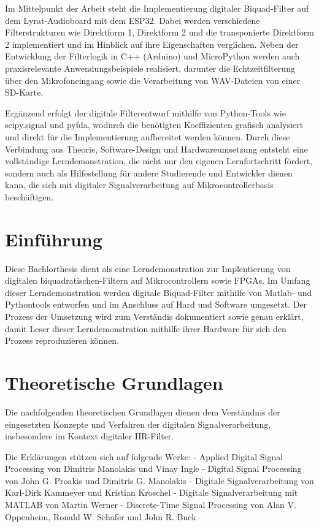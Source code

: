 \documentclass[
  ngerman,
  letterpaper,
  DIV=11]{scrreprt}
\begin{document}
Im Mittelpunkt der Arbeit steht die Implementierung digitaler
Biquad-Filter auf dem Lyrat-Audioboard mit dem ESP32. Dabei werden
verschiedene Filterstrukturen wie Direktform 1, Direktform 2 und die
transponierte Direktform 2 implementiert und im Hinblick auf ihre
Eigenschaften verglichen. Neben der Entwicklung der Filterlogik in C++
(Arduino) und MicroPython werden auch praxisrelevante
Anwendungsbeispiele realisiert, darunter die Echtzeitfilterung über den
Mikrofoneingang sowie die Verarbeitung von WAV-Dateien von einer
SD-Karte.

Ergänzend erfolgt der digitale Filterentwurf mithilfe von Python-Tools
wie scipy.signal und pyfda, wodurch die benötigten Koeffizienten
grafisch analysiert und direkt für die Implementierung aufbereitet
werden können. Durch diese Verbindung aus Theorie, Software-Design und
Hardwareumsetzung entsteht eine vollständige Lerndemonstration, die
nicht nur den eigenen Lernfortschritt fördert, sondern auch als
Hilfestellung für andere Studierende und Entwickler dienen kann, die
sich mit digitaler Signalverarbeitung auf Mikrocontrollerbasis
beschäftigen.

\chapter{Einführung}\label{einfuxfchrung}

Diese Bachlorthesis dient als eine Lerndemonstration zur Implentierung
von digitalen biquadratischen-Filtern auf Mikrocontrollern sowie FPGAs.
Im Umfang dieser Lerndemonstration werden digitale Biquad-Filter
mithilfe von Matlab- und Pythontools entworfen und im Anschluss auf Hard
und Software umgesetzt. Der Prozess der Umsetzung wird zum Verständis
dokumentiert sowie genau erklärt, damit Leser dieser Lerndemonstration
mithilfe ihrer Hardware für sich den Prozess reproduzieren können.

\chapter{Theoretische Grundlagen}\label{theoretische-grundlagen}

Die nachfolgenden theoretischen Grundlagen dienen dem Verständnis der
eingesetzten Konzepte und Verfahren der digitalen Signalverarbeitung,
insbesondere im Kontext digitaler IIR-Filter.

Die Erklärungen stützen sich auf folgende Werke: - Applied Digital
Signal Processing von Dimitris Manolakis und Vinay Ingle - Digital
Signal Processing von John G. Proakis und Dimitris G. Manolakis -
Digitale Signalverarbeitung von Karl-Dirk Kammeyer und Kristian Kroschel
- Digitale Signalverarbeitung mit MATLAB von Martin Werner -
Discrete-Time Signal Processing von Alan V. Oppenheim, Ronald W. Schafer
und John R. Buck
\end{document}
